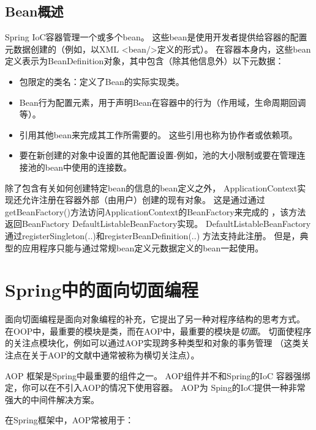 \section{Bean概述}
Spring IoC容器管理一个或多个bean。 
这些bean是使用开发者提供给容器的配置元数据创建的（例如，以XML <bean/>定义的形式）。 
在容器本身内，这些bean定义表示为BeanDefinition对象，其中包含（除其他信息外）以下元数据：

\begin{itemize}
    \item 包限定的类名：定义了Bean的实际实现类。
    \item Bean行为配置元素，用于声明Bean在容器中的行为（作用域，生命周期回调等）。
    \item 引用其他bean来完成其工作所需要的。 这些引用也称为协作者或依赖项。
    \item 要在新创建的对象中设置的其他配置设置-例如，池的大小限制或要在管理连接池的bean中使用的连接数。
\end{itemize}



除了包含有关如何创建特定bean的信息的bean定义之外，
ApplicationContext实现还允许注册在容器外部（由用户）创建的现有对象。
 这是通过通过getBeanFactory()方法访问ApplicationContext的BeanFactory来完成的
 ，该方法返回BeanFactory DefaultListableBeanFactory实现。
  DefaultListableBeanFactory通过registerSingleton(..)和registerBeanDefinition(..)
  方法支持此注册。 但是，典型的应用程序只能与通过常规bean定义元数据定义的bean一起使用。

\chapter{Spring中的面向切面编程}
面向切面编程是面向对象编程的补充，它提出了另一种对程序结构的思考方式。
在OOP中，最重要的模块是类，而在AOP中，最重要的模块是\textit{切面}。
切面使程序的关注点模块化，例如可以通过AOP实现跨多种类型和对象的事务管理
（这类关注点在关于AOP的文献中通常被称为横切关注点）。

AOP 框架是Spring中最重要的组件之一。
AOP组件并不和Spring的IoC 容器强绑定，你可以在不引入AOP的情况下使用容器。
AOP为 Sping的IoC提供一种非常强大的中间件解决方案。

在Spring框架中，AOP常被用于：

